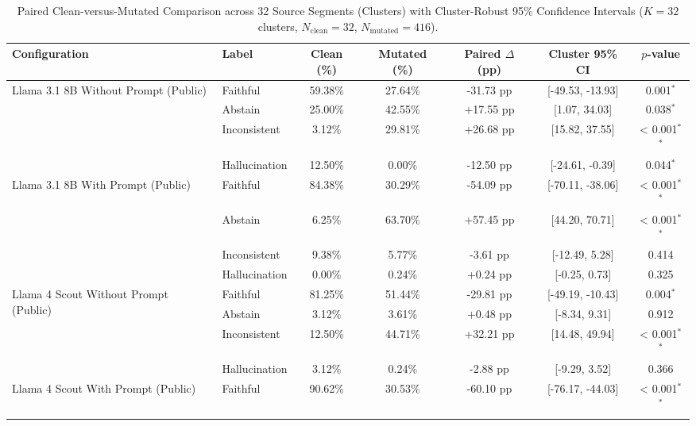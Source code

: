 \begin{table}[htbp]
\centering
\small
\caption{Paired Clean-versus-Mutated Comparison across 32 Source Segments (Clusters) with Cluster-Robust 95\% Confidence Intervals ($K=32$ clusters, $N_{\text{clean}}=32$, $N_{\text{mutated}}=416$).}
\label{tab:paired_clean_mutated}
\begin{tabular}{llccccc}
\toprule
\textbf{Configuration} & \textbf{Label} & \textbf{Clean (\%)} & \textbf{Mutated (\%)} & \textbf{Paired $\Delta$ (pp)} & \textbf{Cluster 95\% CI} & \textbf{$p$-value} \\
\midrule
\multirow{4}{*}{Llama 3.1 8B Without Prompt (Public)} & Faithful & 59.38\% & 27.64\% & -31.73 pp & [-49.53, -13.93] & 0.001$^{*}$ \\
 & Abstain & 25.00\% & 42.55\% & +17.55 pp & [1.07, 34.03] & 0.038$^{*}$ \\
 & Inconsistent & 3.12\% & 29.81\% & +26.68 pp & [15.82, 37.55] & < 0.001$^{*}$$^{*}$ \\
 & Hallucination & 12.50\% & 0.00\% & -12.50 pp & [-24.61, -0.39] & 0.044$^{*}$ \\
\midrule
\multirow{4}{*}{Llama 3.1 8B With Prompt (Public)} & Faithful & 84.38\% & 30.29\% & -54.09 pp & [-70.11, -38.06] & < 0.001$^{*}$$^{*}$ \\
 & Abstain & 6.25\% & 63.70\% & +57.45 pp & [44.20, 70.71] & < 0.001$^{*}$$^{*}$ \\
 & Inconsistent & 9.38\% & 5.77\% & -3.61 pp & [-12.49, 5.28] & 0.414 \\
 & Hallucination & 0.00\% & 0.24\% & +0.24 pp & [-0.25, 0.73] & 0.325 \\
\midrule
\multirow{4}{*}{Llama 4 Scout Without Prompt (Public)} & Faithful & 81.25\% & 51.44\% & -29.81 pp & [-49.19, -10.43] & 0.004$^{*}$ \\
 & Abstain & 3.12\% & 3.61\% & +0.48 pp & [-8.34, 9.31] & 0.912 \\
 & Inconsistent & 12.50\% & 44.71\% & +32.21 pp & [14.48, 49.94] & < 0.001$^{*}$$^{*}$ \\
 & Hallucination & 3.12\% & 0.24\% & -2.88 pp & [-9.29, 3.52] & 0.366 \\
\midrule
\multirow{4}{*}{Llama 4 Scout With Prompt (Public)} & Faithful & 90.62\% & 30.53\% & -60.10 pp & [-76.17, -44.03] & < 0.001$^{*}$$^{*}$ \\
$$
\end{tabular}
\end{table}
